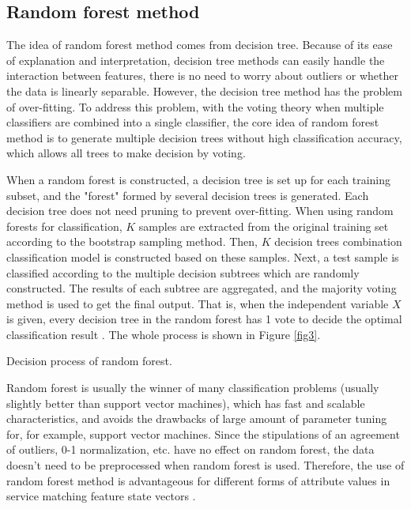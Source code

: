 \documentclass{ieeeaccess}
\begin{document}
\subsection{Random forest method}
The idea of random forest method comes from decision tree. Because of its ease of explanation and interpretation, decision tree methods can easily handle the interaction between features, there is no need to worry about outliers or whether the data is linearly separable. However, the decision tree method has the problem of over-fitting. To address this problem, with the voting theory when multiple classifiers are combined into a single classifier, the core idea of random forest method is to generate multiple decision trees without high classification accuracy, which allows all trees to make decision by voting. 

When a random forest is constructed, a decision tree is set up for each training subset, and the "forest" formed by several decision trees is generated. Each decision tree does not need pruning to prevent over-fitting. When using random forests for classification, $K$ samples are extracted from the original training set according to the bootstrap sampling method. Then, $K$ decision trees combination classification model is constructed based on these samples. Next, a test sample is classified according to the multiple decision subtrees which are randomly constructed. The results of each subtree are aggregated, and the majority voting method is used to get the final output. That is, when the independent variable $X$ is given, every decision tree in the random forest has 1 vote to decide the optimal classification result \cite{lindner2015robust}. The whole process is shown in Figure \ref{fig3}.

{Decision process of random forest.\label{fig3}}

Random forest is usually the winner of many classification problems (usually slightly better than support vector machines), which has fast and scalable characteristics, and avoids the drawbacks of large amount of parameter tuning for, for example, support vector machines. Since the stipulations of an agreement of outliers, 0-1 normalization, etc. have no effect on random forest, the data doesn't need to be preprocessed when random forest is used. Therefore, the use of random forest method is advantageous for different forms of attribute values in service matching feature state vectors \cite{caruana2008empirical}.
\end{document}
